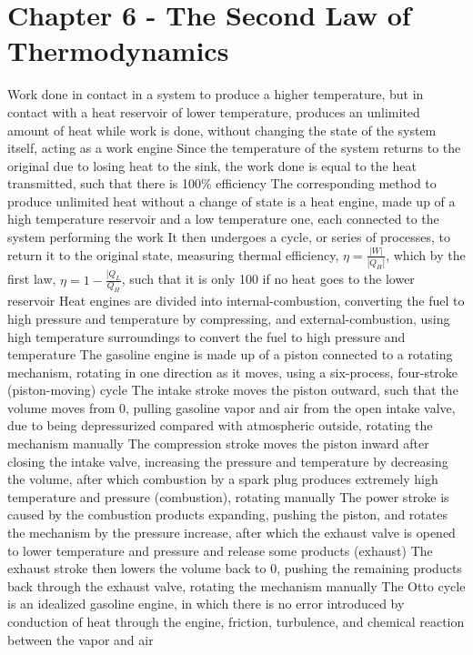 \section{Chapter 6 - The Second Law of Thermodynamics}
\begin{outline*}
\1 Work done in contact in a system to produce a higher temperature, but in contact with a heat reservoir of lower temperature, produces an unlimited amount of heat while work is done, without changing the state of the system itself, acting as a work engine
\2 Since the temperature of the system returns to the original due to losing heat to the sink, the work done is equal to the heat transmitted, such that there is 100\% efficiency
\1 The corresponding method to produce unlimited heat without a change of state is a heat engine, made up of a high temperature reservoir and a low temperature one, each connected to the system performing the work
\2 It then undergoes a cycle, or series of processes, to return it to the original state, measuring thermal efficiency, $\eta = \frac{|W|}{|Q_H|}$, which by the first law, $\eta = 1 - \frac{|Q_L}{Q_H}$, such that it is only 100 if no heat goes to the lower reservoir
\2 Heat engines are divided into internal-combustion, converting the fuel to high pressure and temperature by compressing, and external-combustion, using high temperature surroundings to convert the fuel to high pressure and temperature
\1 The gasoline engine is made up of a piston connected to a rotating mechanism, rotating in one direction as it moves, using a six-process, four-stroke (piston-moving) cycle 
\2 The intake stroke moves the piston outward, such that the volume moves from 0, pulling gasoline vapor and air from the open intake valve, due to being depressurized compared with atmospheric outside, rotating the mechanism manually
\2 The compression stroke moves the piston inward after closing the intake valve, increasing the pressure and temperature by decreasing the volume, after which combustion by a spark plug produces extremely high temperature and pressure (combustion), rotating manually
\2 The power stroke is caused by the combustion products expanding, pushing the piston, and rotates the mechanism by the pressure increase, after which the exhaust valve is opened to lower temperature and pressure and release some products (exhaust)
\2 The exhaust stroke then lowers the volume back to 0, pushing the remaining products back through the exhaust valve, rotating the mechanism manually
\1 The Otto cycle is an idealized gasoline engine, in which there is no error introduced by conduction of heat through the engine, friction, turbulence, and chemical reaction between the vapor and air

\end{outline*}
